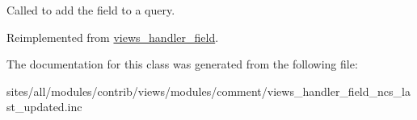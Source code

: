 Called to add the field to a query. 

Reimplemented from \hyperlink{classviews__handler__field_4f661f91bcbe80d4a00c30a31456c502}{views\_\-handler\_\-field}.

The documentation for this class was generated from the following file:\begin{CompactItemize}
\item 
sites/all/modules/contrib/views/modules/comment/views\_\-handler\_\-field\_\-ncs\_\-last\_\-updated.inc\end{CompactItemize}
